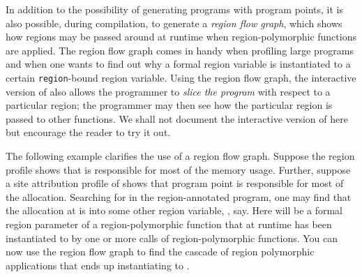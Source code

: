 \documentclass[12pt]{book}
\begin{document}
In addition to the possibility of generating programs with program
points, it is also possible, during compilation, to generate a
%
%
%
\emph{region flow graph}, which shows how regions may be passed around at
runtime when region-polymorphic functions are applied. The region flow graph
comes in handy when profiling large programs and when one wants to find out why
a formal region variable is instantiated to a certain \lstinline{region}-bound
region variable. Using the region flow graph, the interactive version of
 also allows the programmer to \emph{slice the program} with
respect to a particular region; the programmer may then see how the particular
region is passed to other functions. We shall not document the interactive
version of  here but encourage the reader to try it out.

The following example clarifies the use of a region flow graph.  Suppose the
region profile shows that  is responsible for most of the memory usage.
Further, suppose a site attribution profile of  shows that program point
 is responsible for most of the allocation.  Searching for 
in the region-annotated program, one may find that the allocation at 
is into some other region variable, , say.  Here  will be a
formal region parameter of a region-polymorphic function that at runtime has
been instantiated to  by one or more calls of region-polymorphic
functions.  You can now use the region flow graph to find the cascade of region
polymorphic applications that ends up instantiating  to .
\end{document}
